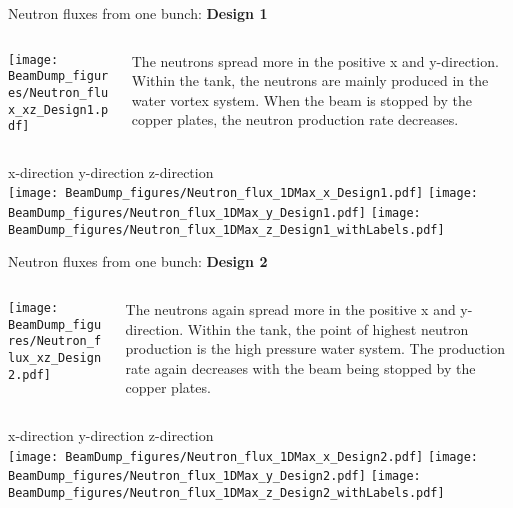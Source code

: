\documentclass[xcolor={dvipsnames}]{beamer}
\begin{document}
\begin{frame}{Neutron fluxes from one bunch: \textbf{Design 1}}
\begin{columns}
 \begin{column}{0.5\textwidth}
    \texttt{[image: BeamDump\_figures/Neutron\_flux\_xz\_Design1.pdf]}
 \end{column}
 \begin{column}{0.5\textwidth}
  The neutrons spread more in the positive x and y-direction. Within the tank, the neutrons are mainly produced in the water vortex system. When the beam is stopped by the copper plates, the neutron production rate decreases.
 \end{column}
\end{columns}
\hspace*{1cm} x-direction \hfill y-direction \hfill z-direction \hspace*{1cm} \\
  \texttt{[image: BeamDump\_figures/Neutron\_flux\_1DMax\_x\_Design1.pdf]}\hfill
  \texttt{[image: BeamDump\_figures/Neutron\_flux\_1DMax\_y\_Design1.pdf]}\hfill
  \texttt{[image: BeamDump\_figures/Neutron\_flux\_1DMax\_z\_Design1\_withLabels.pdf]}
\end{frame}
\begin{frame}{Neutron fluxes from one bunch: \textbf{Design 2}}
\begin{columns}
 \begin{column}{0.5\textwidth}
    \texttt{[image: BeamDump\_figures/Neutron\_flux\_xz\_Design2.pdf]}
 \end{column}
 \begin{column}{0.5\textwidth}
  The neutrons again spread more in the positive x and y-direction. Within the tank, the point of highest neutron production is the high pressure water system. The production rate again decreases with the beam being stopped by the copper plates.
 \end{column}
\end{columns}
\hspace*{1cm} x-direction \hfill y-direction \hfill z-direction \hspace*{1cm} \\
  \texttt{[image: BeamDump\_figures/Neutron\_flux\_1DMax\_x\_Design2.pdf]}\hfill
  \texttt{[image: BeamDump\_figures/Neutron\_flux\_1DMax\_y\_Design2.pdf]}\hfill
  \texttt{[image: BeamDump\_figures/Neutron\_flux\_1DMax\_z\_Design2\_withLabels.pdf]}
\end{frame}
\end{document}
